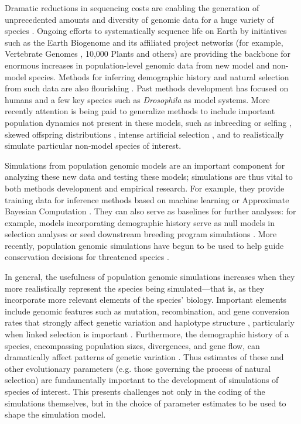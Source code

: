 \documentclass[hidelinks]{article}
\begin{document}
Dramatic reductions in sequencing costs are enabling the generation of
unprecedented amounts and diversity of genomic data for a huge variety of species
\citep{Ellegren2014}. Ongoing efforts to systematically sequence life on
Earth by initiatives such as the Earth Biogenome \citep{Lewin2022} and its
affiliated project networks (for example, Vertebrate Genomes
\citep{Rhie2021}, 10,000 Plants \citep{Cheng2018} and others) are
providing the backbone for enormous increases in population-level genomic data from
new model and non-model species. Methods for inferring
demographic history and natural selection from such data are also flourishing
\citep{Beichman2018}. Past methods development has
focused on humans and a few key species such as \emph{Drosophila}
as model systems. More recently attention is being paid to
generalize methods to include important population dynamics not present
in these models, such as inbreeding or selfing \citep{Blischak2020}, skewed offspring
distributions \citep{Montano2016}, intense artificial selection \citep{MacLeod2013,
MacLeod2014}, and to realistically simulate particular non-model species of interest.

Simulations from population genomic models are an important component
for analyzing these new data and testing these models;
simulations are thus vital to both methods
development and empirical research. For example, they provide training
data for inference methods based on machine learning \citep{Schrider2018} or
Approximate Bayesian Computation \citep{Csillery2010}. They can also serve as
baselines for further analyses: for example, models incorporating
demographic history serve as null models in selection analyses
\citep{Hsieh2016a} or seed downstream breeding program simulations
\citep{Gaynor2020}. More recently, population genomic simulations have begun
to be used to help guide conservation decisions for threatened species
\citep{Teixeira2021}.

In general, the usefulness of population genomic simulations increases
when they more realistically represent the species being simulated---that
is, as they incorporate more relevant elements of the species' biology. Important
elements include genomic features such as mutation, recombination, and gene conversion
rates that strongly affect genetic variation and haplotype structure
\citep{Nachman2002}, particularly when linked selection is important \citep{Cutter2013}.
Furthermore, the demographic history of a
species, encompassing population sizes, divergences, and gene flow, can
dramatically affect patterns of genetic variation \citep{Teshima2006}. Thus
estimates of these and other evolutionary parameters (e.g. those governing
the process of natural selection) are fundamentally important to the
development of simulations of species of interest. This presents
challenges not only in the coding of the simulations themselves, but in
the choice of parameter estimates to be used to shape the simulation
model.
\end{document}
